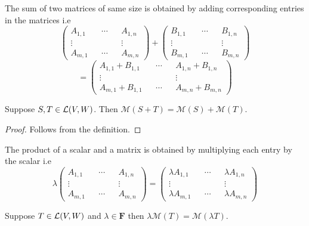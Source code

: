 \begin{definition}
    The sum of two matrices of same size is obtained by adding corresponding entries in the matrices i.e 
    \[ 
    \begin{pmatrix}
        A_{1,1} && \cdots && A_{1,n} \\
        \vdots && && \vdots \\
        A_{m,1} && \cdots && A_{m,n} 
    \end{pmatrix} + \begin{pmatrix}
        B_{1,1} && \cdots && B_{1,n} \\
        \vdots && && \vdots \\
        B_{m,1} && \cdots && B_{m,n} 
    \end{pmatrix} \]
    \[= \begin{pmatrix}
        A_{1,1} + B_{1,1}&& \cdots && A_{1,n}+B_{1,n} \\
        \vdots && && \vdots \\
        A_{m,1} + B_{1,1} && \cdots && A_{m,n} + B_{m,n}
    \end{pmatrix}
     \]
\end{definition}

\begin{proposition}
    Suppose $S,T \in \operatorname{\mathcal{L}}(V,W)$. Then $\mathcal{M}(S+T) = \mathcal{M}(S) + \mathcal{M}(T)$.
\end{proposition}

\begin{proof}
    Follows from the definition.
\end{proof}

\begin{definition}
    The product of a scalar and a matrix is obtained by multiplying each entry by the scalar i.e 
    \[ \lambda \begin{pmatrix}
        A_{1,1} && \cdots && A_{1,n} \\
        \vdots && && \vdots \\
        A_{m,1} && \cdots && A_{m,n} 
    \end{pmatrix} = \begin{pmatrix}
        \lambda A_{1,1} && \cdots && \lambda A_{1,n} \\
        \vdots && && \vdots \\
        \lambda A_{m,1} && \cdots && \lambda A_{m,n} 
    \end{pmatrix} \]
\end{definition}

\begin{proposition}
    Suppose $T \in \operatorname{\mathcal{L}}(V,W)$ and $\lambda \in \mathbf{F}$ then $\lambda \mathcal{M}(T) = \mathcal{M}(\lambda T)$.
\end{proposition}

